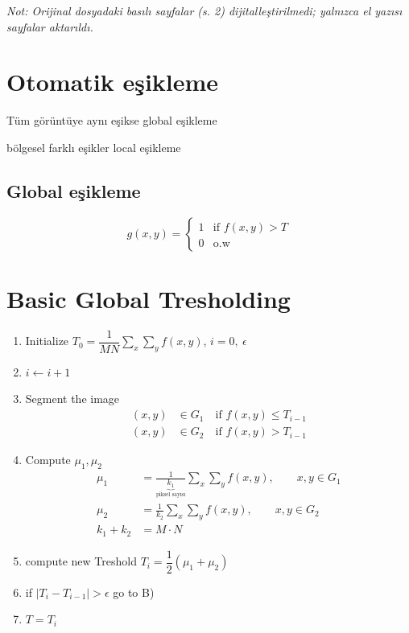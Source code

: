\documentclass[11pt,a4paper]{article}
\begin{document}
\textit{Not: Orijinal dosyadaki basılı sayfalar (s. 2) dijitalleştirilmedi; yalnızca el yazısı sayfalar aktarıldı.}

\section{Otomatik eşikleme}

Tüm görüntüye aynı eşikse global eşikleme

bölgesel farklı eşikler local eşikleme

\subsection{Global eşikleme}
\[
g(x,y)=\begin{cases} 1 & \text{if } f(x,y)>T\\ 0 & \text{o.w} \end{cases}
\]

\section{Basic Global Tresholding}
\begin{enumerate}[label=\Alph*), leftmargin=*]
\item Initialize $T_0=\dfrac{1}{MN}\displaystyle\sum_x\sum_y f(x,y)$, $i=0,\ \epsilon$
\item $i\leftarrow i+1$
\item Segment the image
  \begin{align*}
  (x,y)&\in G_1 \quad\text{if } f(x,y)\le T_{i-1}\\
  (x,y)&\in G_2 \quad\text{if } f(x,y)> T_{i-1}
  \end{align*}
\item Compute $\mu_1,\mu_2$
  \begin{align*}
  \mu_1&=\frac{1}{\underbrace{k_1}_{\text{piksel sayısı}}}\sum_x\sum_y f(x,y), \qquad x,y\in G_1\\
  \mu_2&=\frac{1}{k_2}\sum_x\sum_y f(x,y), \qquad x,y\in G_2\\
  k_1+k_2&=M\cdot N
  \end{align*}
\item compute new Treshold \quad $T_i=\dfrac{1}{2}(\mu_1+\mu_2)$
\item if $|T_i-T_{i-1}|>\epsilon$ \quad go to B)
\item $T=T_i$
\end{enumerate}
\end{document}
